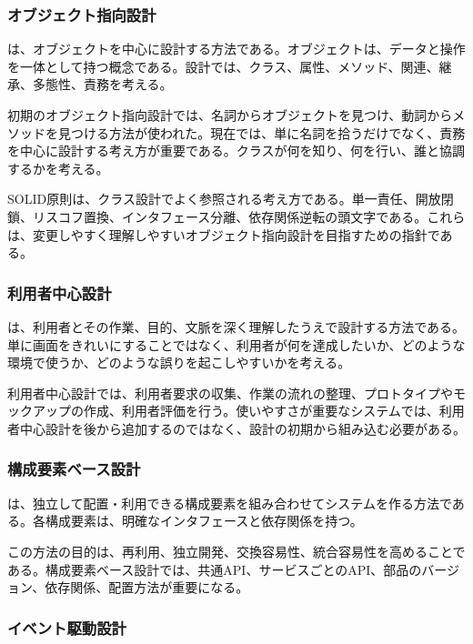 \subsubsection{オブジェクト指向設計}

 は、オブジェクトを中心に設計する方法である。オブジェクトは、データと操作を一体として持つ概念である。設計では、クラス、属性、メソッド、関連、継承、多態性、責務を考える。

初期のオブジェクト指向設計では、名詞からオブジェクトを見つけ、動詞からメソッドを見つける方法が使われた。現在では、単に名詞を拾うだけでなく、責務を中心に設計する考え方が重要である。クラスが何を知り、何を行い、誰と協調するかを考える。

SOLID原則は、クラス設計でよく参照される考え方である。単一責任、開放閉鎖、リスコフ置換、インタフェース分離、依存関係逆転の頭文字である。これらは、変更しやすく理解しやすいオブジェクト指向設計を目指すための指針である。

\subsubsection{利用者中心設計}

 は、利用者とその作業、目的、文脈を深く理解したうえで設計する方法である。単に画面をきれいにすることではなく、利用者が何を達成したいか、どのような環境で使うか、どのような誤りを起こしやすいかを考える。

利用者中心設計では、利用者要求の収集、作業の流れの整理、プロトタイプやモックアップの作成、利用者評価を行う。使いやすさが重要なシステムでは、利用者中心設計を後から追加するのではなく、設計の初期から組み込む必要がある。

\subsubsection{構成要素ベース設計}

 は、独立して配置・利用できる構成要素を組み合わせてシステムを作る方法である。各構成要素は、明確なインタフェースと依存関係を持つ。

この方法の目的は、再利用、独立開発、交換容易性、統合容易性を高めることである。構成要素ベース設計では、共通API、サービスごとのAPI、部品のバージョン、依存関係、配置方法が重要になる。

\subsubsection{イベント駆動設計}

